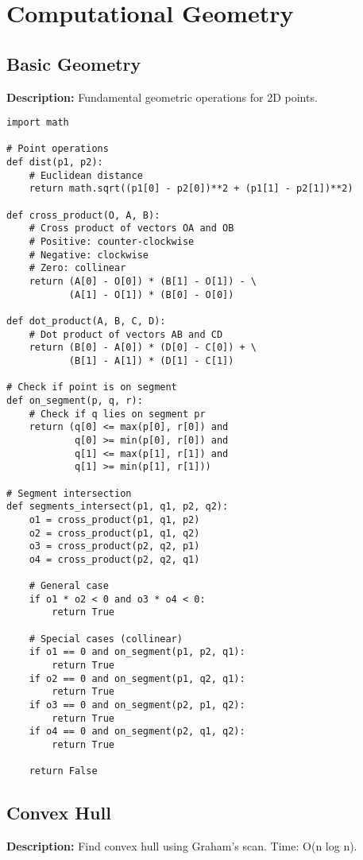 \section{Computational Geometry}

\subsection{Basic Geometry}
\textbf{Description:} Fundamental geometric operations for 2D points.

\begin{lstlisting}
import math

# Point operations
def dist(p1, p2):
    # Euclidean distance
    return math.sqrt((p1[0] - p2[0])**2 + (p1[1] - p2[1])**2)

def cross_product(O, A, B):
    # Cross product of vectors OA and OB
    # Positive: counter-clockwise
    # Negative: clockwise
    # Zero: collinear
    return (A[0] - O[0]) * (B[1] - O[1]) - \
           (A[1] - O[1]) * (B[0] - O[0])

def dot_product(A, B, C, D):
    # Dot product of vectors AB and CD
    return (B[0] - A[0]) * (D[0] - C[0]) + \
           (B[1] - A[1]) * (D[1] - C[1])

# Check if point is on segment
def on_segment(p, q, r):
    # Check if q lies on segment pr
    return (q[0] <= max(p[0], r[0]) and 
            q[0] >= min(p[0], r[0]) and
            q[1] <= max(p[1], r[1]) and 
            q[1] >= min(p[1], r[1]))

# Segment intersection
def segments_intersect(p1, q1, p2, q2):
    o1 = cross_product(p1, q1, p2)
    o2 = cross_product(p1, q1, q2)
    o3 = cross_product(p2, q2, p1)
    o4 = cross_product(p2, q2, q1)
    
    # General case
    if o1 * o2 < 0 and o3 * o4 < 0:
        return True
    
    # Special cases (collinear)
    if o1 == 0 and on_segment(p1, p2, q1):
        return True
    if o2 == 0 and on_segment(p1, q2, q1):
        return True
    if o3 == 0 and on_segment(p2, p1, q2):
        return True
    if o4 == 0 and on_segment(p2, q1, q2):
        return True
    
    return False
\end{lstlisting}

\subsection{Convex Hull}
\textbf{Description:} Find convex hull using Graham's scan. Time: O(n log n).

